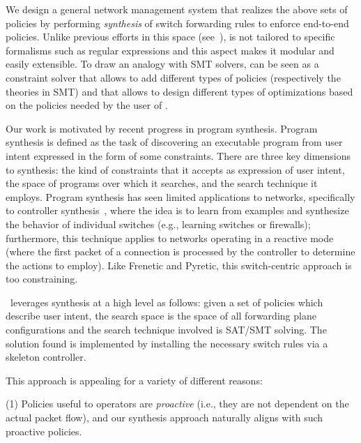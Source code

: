 We design a general network management system that realizes the above
sets of policies by performing {\em synthesis} of switch forwarding
rules to enforce end-to-end policies. 
Unlike previous efforts in this space (see~\cite{}),
\Name is not tailored to 
specific formalisms such as regular expressions and
this aspect makes it modular  and easily extensible.
To draw an analogy with SMT solvers, 
\Name can be seen as a constraint solver
that allows to add different types of policies (respectively the theories in SMT) and
that allows to design different types of optimizations based on the 
policies needed by the user of \Name.

Our work is motivated by recent
progress in program synthesis.  
Program synthesis is defined as the task of discovering an executable
program from user intent expressed in the form of some
constraints. There are three key dimensions to synthesis: the kind of
constraints that it accepts as expression of user intent, the space of
programs over which it searches, and the search technique it
employs. Program synthesis has seen limited applications to networks,
specifically to controller synthesis~\cite{netegg}, where the idea is
to learn from examples and synthesize the behavior of individual
switches (e.g., learning switches or firewalls); furthermore, this
technique applies to networks operating in a reactive mode (where the
first packet of a connection is processed by the controller to
determine the actions to employ). Like Frenetic and Pyretic, this
switch-centric approach is too constraining.

\Name\ leverages synthesis at a high level as follows: given a set of
policies which describe user intent, the search space is the space of
all forwarding plane configurations and the search technique involved
is SAT/SMT solving. The solution found is implemented by installing
the necessary switch rules via a skeleton controller.

This approach is appealing for a variety of different reasons: 

(1)
Policies useful to operators are \emph{proactive} (i.e., they are not
dependent on the actual packet flow), and our synthesis approach
naturally aligns with such proactive policies.


